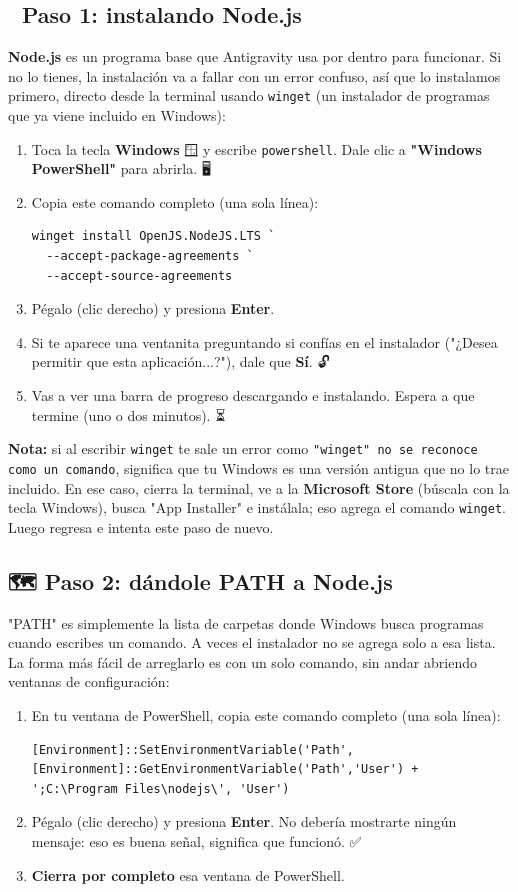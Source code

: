 \documentclass[12pt]{article}
\begin{document}
\subsection{🧱 Paso 1: instalando Node.js}
\textbf{Node.js} es un programa base que Antigravity usa por dentro para funcionar. Si no lo tienes, la instalación va a fallar con un error confuso, así que lo instalamos primero, directo desde la terminal usando \texttt{winget} (un instalador de programas que ya viene incluido en Windows):

\begin{enumerate}
    \item Toca la tecla \textbf{Windows} 🪟 y escribe \texttt{powershell}. Dale clic a \textbf{"Windows PowerShell"} para abrirla. 🖥️
    \item Copia este comando completo (una sola línea):
\begin{verbatim}
winget install OpenJS.NodeJS.LTS `
  --accept-package-agreements `
  --accept-source-agreements
\end{verbatim}
    \item Pégalo (clic derecho) y presiona \textbf{Enter}.
    \item Si te aparece una ventanita preguntando si confías en el instalador ("¿Desea permitir que esta aplicación...?"), dale que \textbf{Sí}. 🔓
    \item Vas a ver una barra de progreso descargando e instalando. Espera a que termine (uno o dos minutos). ⏳
\end{enumerate}

\textbf{Nota:} si al escribir \texttt{winget} te sale un error como \texttt{"winget" no se reconoce como un comando}, significa que tu Windows es una versión antigua que no lo trae incluido. En ese caso, cierra la terminal, ve a la \textbf{Microsoft Store} (búscala con la tecla Windows), busca "App Installer" e instálala; eso agrega el comando \texttt{winget}. Luego regresa e intenta este paso de nuevo. 🏪

\subsection{🗺️ Paso 2: dándole PATH a Node.js}
"PATH" es simplemente la lista de carpetas donde Windows busca programas cuando escribes un comando. A veces el instalador no se agrega solo a esa lista. La forma más fácil de arreglarlo es con un solo comando, sin andar abriendo ventanas de configuración:

\begin{enumerate}
    \item En tu ventana de PowerShell, copia este comando completo (una sola línea):
\begin{verbatim}
[Environment]::SetEnvironmentVariable('Path',
[Environment]::GetEnvironmentVariable('Path','User') +
';C:\Program Files\nodejs\', 'User')
\end{verbatim}
    \item Pégalo (clic derecho) y presiona \textbf{Enter}. No debería mostrarte ningún mensaje: eso es buena señal, significa que funcionó. ✅
    \item \textbf{Cierra por completo} esa ventana de PowerShell.
\end{enumerate}
\end{document}
